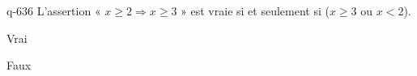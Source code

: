 \begin{truefalse}{q-636}
L'assertion « $x\geq 2 \Rightarrow x \geq 3$ » est vraie si et seulement si ($x\geq 3$ ou $x<2$).
\item* Vrai
\item Faux
\end{truefalse}

